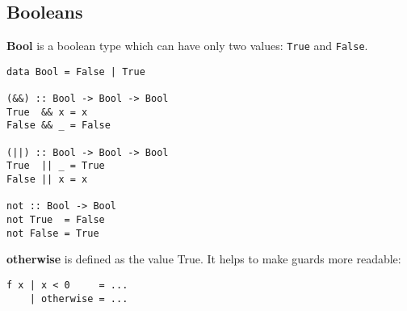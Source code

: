 %

\subsection{Booleans}
\textbf{Bool} is a boolean type which can have only two values: \texttt{True} and  \texttt{False}.

\begin{verbatim}
data Bool = False | True

(&&) :: Bool -> Bool -> Bool
True  && x = x
False && _ = False

(||) :: Bool -> Bool -> Bool
True  || _ = True
False || x = x

not :: Bool -> Bool
not True  = False
not False = True
\end{verbatim}

\textbf{otherwise} is defined as the value True. It helps to make guards more readable:
\begin{verbatim}
f x | x < 0     = ...
    | otherwise = ...
\end{verbatim}

%
